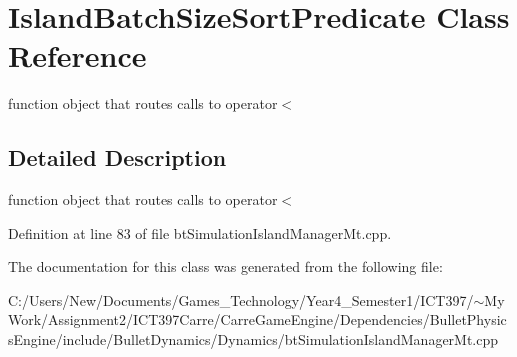 \hypertarget{class_island_batch_size_sort_predicate}{
\section{IslandBatchSizeSortPredicate Class Reference}
\label{class_island_batch_size_sort_predicate}
}
function object that routes calls to operator$<$  




\subsection{Detailed Description}
function object that routes calls to operator$<$ 

Definition at line 83 of file btSimulationIslandManagerMt.cpp.

The documentation for this class was generated from the following file:\begin{CompactItemize}
\item 
C:/Users/New/Documents/Games\_\-Technology/Year4\_\-Semester1/ICT397/$\sim$My Work/Assignment2/ICT397Carre/CarreGameEngine/Dependencies/BulletPhysicsEngine/include/BulletDynamics/Dynamics/btSimulationIslandManagerMt.cpp\end{CompactItemize}
